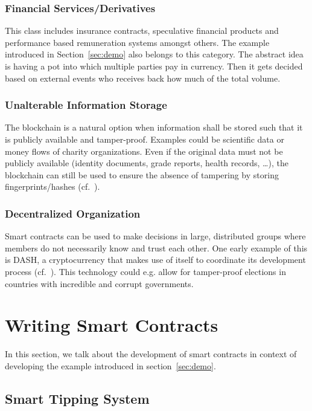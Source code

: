 \subsubsection{Financial Services/Derivatives}

This class includes insurance contracts, speculative financial products and performance
based remuneration systems amongst others.
The example introduced in Section~\ref{sec:demo} also belongs
to this category.
The abstract idea is having a pot into which multiple parties pay in
currency.
Then it gets decided based on external events who receives back how much of the
total volume.

\subsubsection{Unalterable Information Storage}

The blockchain is a natural option when information shall be stored such that it
is publicly available and tamper-proof.
Examples could be scientific data or money flows of charity organizations.
Even if the original data must not be publicly available (identity documents, grade reports, health records, \ldots),
the blockchain can still be used to ensure the absence of tampering by storing fingerprints/hashes (cf.\ \cite{Marx18-2}).

\subsubsection{Decentralized Organization}

Smart contracts can be used to make decisions in large, distributed groups where
members do not necessarily know and trust each other. One early example of this is
DASH, a cryptocurrency that makes use of itself to coordinate its development process
(cf.\ \cite{Galt2015}). This technology could e.g. allow for tamper-proof elections
in countries with incredible and corrupt governments.

\section{Writing Smart Contracts}

In this section, we talk about the development of smart contracts in context
of developing the example introduced in section~\ref{sec:demo}.

\subsection{Smart Tipping System}

